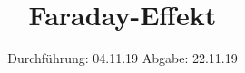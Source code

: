 

\subject{V47}
\title{Faraday-Effekt}
\date{%
  Durchführung: 04.11.19
  \hspace{3em}
  Abgabe: 22.11.19
}



\maketitle
\thispagestyle{empty}
\tableofcontents
\newpage







\printbibliography{}


